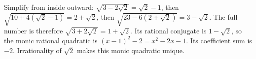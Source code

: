 Simplify from inside outward: $\sqrt{3-2\sqrt2}=\sqrt2-1$, then $\sqrt{10+4(\sqrt2-1)}=2+\sqrt2$, then $\sqrt{23-6(2+\sqrt2)}=3-\sqrt2$. The full number is therefore $\sqrt{3+2\sqrt2}=1+\sqrt2$. Its rational conjugate is $1-\sqrt2$, so the monic rational quadratic is $(x-1)^2-2=x^2-2x-1$. Its coefficient sum is $\boxed{-2}$. Irrationality of $\sqrt2$ makes this monic quadratic unique.
